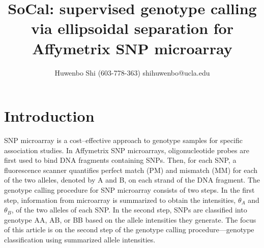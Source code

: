 \documentclass{scrartcl}
\begin{document}

\newcommand*{\TitleFont}{
      \usefont{\encodingdefault}{\rmdefault}{b}{n}
      \fontsize{16}{20}
      \selectfont}
\newcommand*{\AuthorFont}{
      \usefont{\encodingdefault}{\rmdefault}{r}{n}
      \fontsize{12}{20}
      \selectfont}
\title{\TitleFont SoCal: supervised genotype calling via ellipsoidal
separation for Affymetrix SNP microarray}
\author{\AuthorFont Huwenbo Shi (603-778-363) shihuwenbo@ucla.edu}
\date{}
\maketitle










\section{Introduction}

\par
SNP microarray is a cost--effective approach to genotype samples for specific
association studies. %
In Affymetrix SNP microarrays, oligonucleotide probes are first used to bind
DNA fragments containing SNPs. %
Then, for each SNP, a fluorescence scanner quantifies perfect match (PM) and
mismatch (MM) for each of the two alleles, denoted by A and B, on
each strand of the DNA fragment. %
The genotype calling procedure for SNP microarray consists of two steps.
In the first step, information from microarray is summarized to obtain the
intensities, $\theta_A$ and $\theta_B$, of the two alleles of each SNP.
In the second step, SNPs are classified into genotype AA, AB, or BB based on
the allele intensities they generate.
The focus of this article is on the second step of the genotype calling
procedure---genotype classification using summarized allele intensities.
\end{document}
